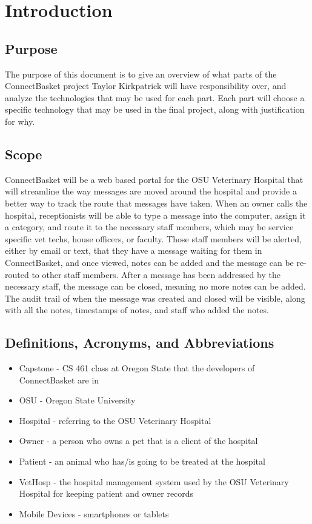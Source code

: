 \documentclass[onecolumn, draftclsnofoot,10pt, compsoc]{IEEEtran}
\begin{document}
\section{Introduction}

\subsection{Purpose}
The purpose of this document is to give an overview of what parts of the ConnectBasket project Taylor Kirkpatrick will have responsibility over,
and analyze the technologies that may be used for each part. Each part will choose a specific technology that may be used in the final project, 
along with justification for why.


\subsection{Scope}
ConnectBasket will be a web based portal for the OSU Veterinary Hospital that will streamline the way messages are moved around the hospital and 
provide a better way to track the route that messages have taken. When an owner calls the hospital, receptionists will be able to type a message 
into the computer, assign it a category, and route it to the necessary staff members, which may be service specific vet techs, house officers, or 
faculty. Those staff members will be alerted, either by email or text, that they have a message waiting for them in ConnectBasket, and once viewed, 
notes can be added and the message can be re-routed to other staff members. After a message has been addressed by the necessary staff, the message 
can be closed, meaning no more notes can be added. The audit trail of when the message was created and closed will be visible, along with all the 
notes, timestamps of notes, and staff who added the notes.


\subsection{Definitions, Acronyms, and Abbreviations}
\begin{itemize}
\item Capstone - CS 461 class at Oregon State that the developers of ConnectBasket are in
 
\item OSU - Oregon State University

\item Hospital - referring to the OSU Veterinary Hospital

\item Owner - a person who owns a pet that is a client of the hospital

\item Patient - an animal who has/is going to be treated at the hospital 

\item VetHosp - the hospital management system used by the OSU Veterinary Hospital for keeping patient and owner records

\item Mobile Devices - smartphones or tablets
\end{itemize}
\end{document}
